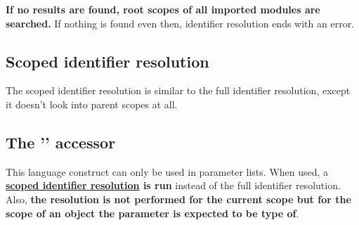 \begin{comment}
\textbf{Namespace scopes}
\begin{compactenum}
\item Current scope and scopes of all namespaces with the same (full) identifier in any of the modules that have been imported in the identifier resolution scope (that means also all imports derived from parent scopes).
\item Parent scope (recursive)
\end{compactenum}
\end{comment}

\textbf{If no results are found, root scopes of all imported modules are searched.} If nothing is found even then, identifier resolution ends with an error.

\begin{comment}
\begin{code}
module a;

Void a() {}
Void b() {}

Void f() {
// First, we search in the current scope (inside the function) -> not found
// Then, we search in the parent scope (which is the module scope) -> found function a
a();

Int32 a;

// Now when we search in the current scope, we find variable a
a = 5;
}

$\moduleSep$
module b;

Void a() {}

class C {

@public:
Void a() {}
Void c() {}
Void f() {

}	

}

class D : @public C {

@public:
Void c() {}
Void g() {

}

}
\end{code}
\end{comment}

\subsection{Scoped identifier resolution} \label{scopedIdentifierResolution}
The scoped identifier resolution is similar to the full identifier resolution, except it doesn't look into parent scopes at all.

\subsection{The '' accessor} \label{colonAccessor}
This language construct can only be used in parameter lists. When used, a \textbf{\hyperref[scopedIdentifierResolution]{scoped identifier resolution} is run} instead of the full identifier resolution. Also, \textbf{the resolution is not performed for the current scope but for the scope of an object the parameter is expected to be type of}.

